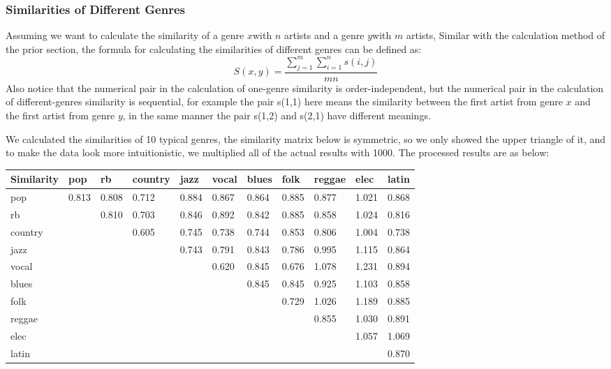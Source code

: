 \documentclass[12pt]{article}
\begin{document}
\subsubsection{Similarities of Different Genres}\quad \;
Assuming we want to calculate the similarity of a genre  ${\displaystyle x}$with ${\displaystyle n}$ artists and a genre  ${\displaystyle y}$with ${\displaystyle m}$ artists,
Similar with the calculation method of the prior section, the formula for calculating the similarities of different genres can be defined as:
\[S(x,y) = \frac{{\sum\limits_{j = 1}^m {\sum\limits_{i = 1}^n {s(i,j)} } }}{{mn}}\]
Also notice that the numerical pair in the calculation of one-genre similarity is order-independent, but the numerical pair in the calculation of different-genres similarity is sequential, for example the pair s(1,1) here means the similarity between the first artist from genre ${\displaystyle x}$ and the first artist from genre ${\displaystyle y}$, in the same manner the pair s(1,2) and s(2,1) have different meanings.\par
We calculated the similarities of 10 typical genres, the similarity matrix below is symmetric, so we only showed the upper triangle of it, and to make the data look more intuitionistic, we multiplied all of the actual results with 1000. The processed results are as below:
\begin{table}[h]
    \centering
    \begin{tabular}{|l|l|l|l|l|l|l|l|l|l|l|}
    \hline
        Similarity & pop & rb & country & jazz & vocal & blues & folk & reggae & elec & latin \\ \hline
        pop & 0.813 & 0.808 & 0.712 & 0.884 & 0.867 & 0.864 & 0.885 & 0.877 & 1.021 & 0.868 \\ \hline
        rb &  & 0.810 & 0.703 & 0.846 & 0.892 & 0.842 & 0.885 & 0.858 & 1.024 & 0.816 \\ \hline
        country &  &  & 0.605 & 0.745 & 0.738 & 0.744 & 0.853 & 0.806 & 1.004 & 0.738 \\ \hline
        jazz &  &  &  & 0.743 & 0.791 & 0.843 & 0.786 & 0.995 & 1.115 & 0.864 \\ \hline
        vocal &  &  &  &  & 0.620 & 0.845 & 0.676 & 1.078 & 1.231 & 0.894 \\ \hline
        blues &  &  &  &  &  & 0.845 & 0.845 & 0.925 & 1.103 & 0.858 \\ \hline
        folk &  &  &  &  &  &  & 0.729 & 1.026 & 1.189 & 0.885 \\ \hline
        reggae &  &  &  &  &  &  &  & 0.855 & 1.030 & 0.891 \\ \hline
        elec &  &  &  &  &  &  &  &  & 1.057 & 1.069 \\ \hline
        latin &  &  &  &  &  &  &  &  &  & 0.870 \\ \hline
    \end{tabular}
\end{table}
\end{document}
